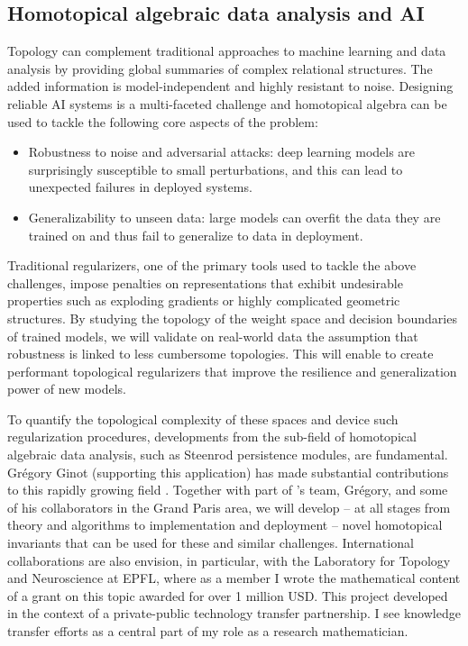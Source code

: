 \subsection{Homotopical algebraic data analysis and AI} \label{ss:ai}

Topology can complement traditional approaches to machine learning and data analysis by providing global summaries of complex relational structures.
The added information is model-independent and highly resistant to noise.
Designing reliable AI systems is a multi-faceted challenge and homotopical algebra can be used to tackle the following core aspects of the problem:

\begin{itemize}
	\item Robustness to noise and adversarial attacks: deep learning models are surprisingly susceptible to small perturbations, and this can lead to unexpected failures in deployed systems.
	\item Generalizability to unseen data: large models can overfit the data they are trained on and thus fail to generalize to data in deployment.
\end{itemize}
Traditional regularizers, one of the primary tools used to tackle the above challenges, impose penalties on representations that exhibit undesirable properties such as exploding gradients or highly complicated geometric structures.
By studying the topology of the weight space and decision boundaries of trained models, we will validate on real-world data the assumption that robustness is linked to less cumbersome topologies.
This will enable to create performant topological regularizers that improve the resilience and generalization power of new models.

To quantify the topological complexity of these spaces and device such regularization procedures, developments from the sub-field of homotopical algebraic data analysis, such as Steenrod persistence modules, are fundamental.
Gr\'egory Ginot (supporting this application) has made substantial contributions to this rapidly growing field \cite{ginot2021multiplicative}.
Together with part of \giottoTDA's team, Gr\'egory, and some of his collaborators in the Grand Paris area, we will develop -- at all stages from theory and algorithms to implementation and deployment -- novel homotopical invariants that can be used for these and similar challenges.
International collaborations are also envision, in particular, with the Laboratory for Topology and Neuroscience at EPFL, where as a member I wrote the mathematical content of a grant on this topic awarded for over 1 million USD.
This project developed in the context of a private-public technology transfer partnership.
I see knowledge transfer efforts as a central part of my role as a research mathematician.

